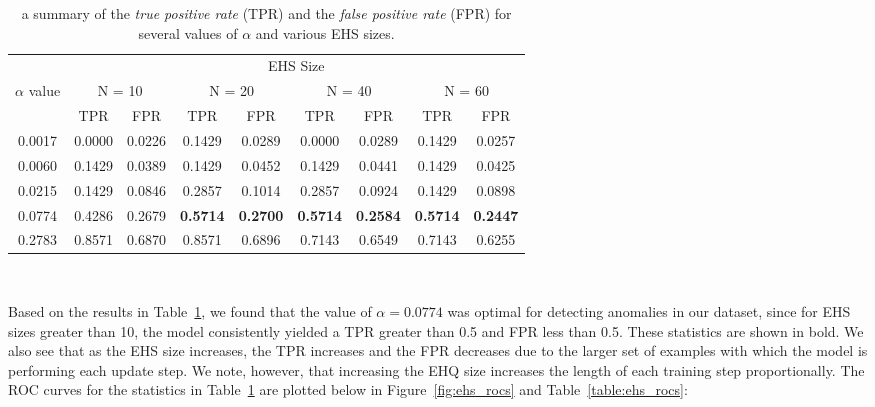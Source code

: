 \documentclass[12pt]{article}
\begin{document}
\begin{table}[H]
\begin{center}
\begin{tabular}{| c | c c | c c | c c | c c |}
\hline
& \multicolumn{8}{c|}{EHS Size} \\
$\alpha$ value & \multicolumn{2}{c}{N = 10} & \multicolumn{2}{c}{N = 20} & \multicolumn{2}{c}{N = 40} & \multicolumn{2}{c|}{N = 60}\\
& TPR & FPR & TPR & FPR & TPR & FPR & TPR & FPR \\
\hline
0.0017  &  0.0000  &  0.0226  &  0.1429  &  0.0289  &  0.0000  &  0.0289  &  0.1429  &  0.0257 \\
0.0060  &  0.1429  &  0.0389  &  0.1429  &  0.0452  &  0.1429  &  0.0441  &  0.1429  &  0.0425 \\
0.0215  &  0.1429  &  0.0846  &  0.2857  &  0.1014  &  0.2857   &  0.0924  &  0.1429  &  0.0898 \\
0.0774  & 0.4286  &  0.2679  &  \textbf{0.5714}  &  \textbf{0.2700}  &  \textbf{0.5714}  &  \textbf{0.2584}  &  \textbf{0.5714}  &  \textbf{0.2447} \\
0.2783  &  0.8571  &  0.6870  &  0.8571  &  0.6896  &  0.7143  &  0.6549  &  0.7143  &  0.6255 \\
\hline
\end{tabular}\\[2mm]
\end{center}
\caption{ a summary of the \textit{true positive rate} (TPR) and the \textit{false positive rate} (FPR) for several values of $\alpha$ and various EHS sizes.}
\label{table:roc_stats}
\end{table}

Based on the results in Table~\ref{table:roc_stats}, we found that the value of $\alpha = 0.0774$ was optimal for detecting anomalies in our dataset, since for EHS sizes greater than 10, the model consistently yielded a TPR greater than 0.5 and FPR less than 0.5. These statistics are shown in bold. We also see that as the EHS size increases, the TPR increases and the FPR decreases due to the larger set of examples with which the model is performing each update step. We note, however, that increasing the EHQ size increases the length of each training step proportionally. The ROC curves for the statistics in Table~\ref{table:roc_stats} are plotted below in Figure~\ref{fig:ehs_rocs} and Table~\ref{table:ehs_rocs}:
\end{document}
